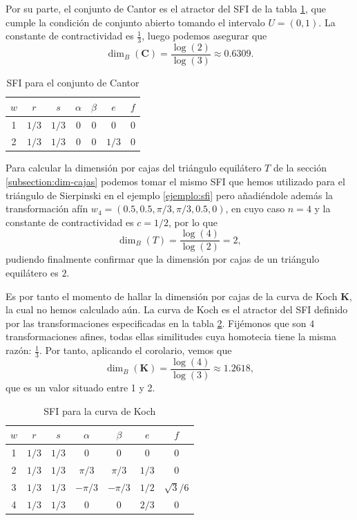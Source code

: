 Por su parte, el conjunto de Cantor es el atractor del SFI de la tabla \ref{tabla:Cantor}, que cumple la condición de conjunto abierto tomando el intervalo $U=(0,1)$. La constante de contractividad es $\frac{1}{3}$, luego podemos asegurar que 
$$\dim_B(\mathbf C)=\frac{\log(2)}{\log(3)}\approx 0.6309.$$

\begin{table}[ht]
    \centering
    \begin{tabular}{c|cccccc} \hline
        $w$ & $r$ & $s$ & $\alpha$ & $\beta$ & $e$ & $f$ \\ \hline\hline
    1 & $1/3$ & $1/3$ & 0 & 0 & 0 & 0 \\ \hline
    2 & $1/3$ & $1/3$ & $0$ & $0$ & $1/3$ & 0 \\ \hline
    \end{tabular}
    \caption{SFI para el conjunto de Cantor}
    \label{tabla:Cantor}
\end{table}

Para calcular la dimensión por cajas del triángulo equilátero $T$ de la sección \ref{subsection:dim-cajas} podemos tomar el mismo SFI que hemos utilizado para el triángulo de Sierpinski en el ejemplo \ref{ejemplo:sfi} pero añadiéndole además la transformación afín $w_4 = \left(0.5, 0.5, \pi/3, \pi/3, 0.5, 0\right)$, en cuyo caso $n=4$ y la constante de contractividad es $c=1/2$, por lo que 
$$\dim_B(T)=\frac{\log(4)}{\log(2)}=2,$$ 
pudiendo finalmente confirmar que la dimensión por cajas de un triángulo equilátero es $2$.

Es por tanto el momento de hallar la dimensión por cajas de la curva de Koch \textbf{K}, la cual no hemos calculado aún. La curva de Koch es el atractor del SFI definido por las transformaciones especificadas en la tabla \ref{tabla:curva-koch}. Fijémonos que son $4$ transformaciones afines, todas ellas similitudes cuya homotecia tiene la misma razón: $\frac{1}{3}$. Por tanto, aplicando el corolario, vemos que
$$
\dim_B(\mathbf{K})=\dfrac{\log(4)}{\log(3)} \approx 1.2618,
$$
que es un valor situado entre 1 y 2.

\begin{table}[ht]
    \centering
    \begin{tabular}{c|cccccc} \hline
        $w$ & $r$ & $s$ & $\alpha$ & $\beta$ & $e$ & $f$ \\ \hline\hline
    1 & $1/3$ & $1/3$ & 0 & 0 & 0 & 0 \\ \hline
    2 & $1/3$ & $1/3$ & $\pi/3$ & $\pi/3$ & $1/3$ & 0 \\ \hline
    3 & $1/3$ & $1/3$ & $-\pi/3$ & $-\pi/3$ & $1/2$ & $\sqrt{3}/6$ \\ \hline
    4 & $1/3$ & $1/3$ & 0 & 0 & $2/3$ & 0 \\ \hline
    \end{tabular}
    \caption{SFI para la curva de Koch}
    \label{tabla:curva-koch}
\end{table}

